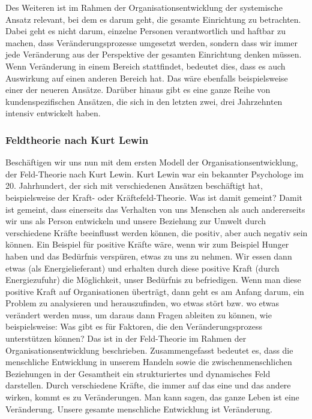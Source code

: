 \documentclass[
  letterpaper,
]{book}
\begin{document}
Des Weiteren ist im Rahmen der Organisationsentwicklung der systemische
Ansatz relevant, bei dem es darum geht, die gesamte Einrichtung zu
betrachten. Dabei geht es nicht darum, einzelne Personen verantwortlich
und haftbar zu machen, dass Veränderungsprozesse umgesetzt werden,
sondern dass wir immer jede Veränderung aus der Perspektive der gesamten
Einrichtung denken müssen. Wenn Veränderung in einem Bereich
stattfindet, bedeutet dies, dass es auch Auswirkung auf einen anderen
Bereich hat. Das wäre ebenfalls beispielsweise einer der neueren
Ansätze. Darüber hinaus gibt es eine ganze Reihe von kundenspezifischen
Ansätzen, die sich in den letzten zwei, drei Jahrzehnten intensiv
entwickelt haben.

\subsubsection{Feldtheorie nach Kurt
Lewin}\label{feldtheorie-nach-kurt-lewin}

Beschäftigen wir uns nun mit dem ersten Modell der
Organisationsentwicklung, der Feld-Theorie nach Kurt Lewin. Kurt Lewin
war ein bekannter Psychologe im 20. Jahrhundert, der sich mit
verschiedenen Ansätzen beschäftigt hat, beispielsweise der Kraft- oder
Kräftefeld-Theorie. Was ist damit gemeint? Damit ist gemeint, dass
einerseits das Verhalten von uns Menschen als auch andererseits wir uns
als Person entwickeln und unsere Beziehung zur Umwelt durch verschiedene
Kräfte beeinflusst werden können, die positiv, aber auch negativ sein
können. Ein Beispiel für positive Kräfte wäre, wenn wir zum Beispiel
Hunger haben und das Bedürfnis verspüren, etwas zu uns zu nehmen. Wir
essen dann etwas (als Energielieferant) und erhalten durch diese
positive Kraft (durch Energiezufuhr) die Möglichkeit, unser Bedürfnis zu
befriedigen. Wenn man diese positive Kraft auf Organisationen überträgt,
dann geht es am Anfang darum, ein Problem zu analysieren und
herauszufinden, wo etwas stört bzw. wo etwas verändert werden muss, um
daraus dann Fragen ableiten zu können, wie beispielsweise: Was gibt es
für Faktoren, die den Veränderungsprozess unterstützen können? Das ist
in der Feld-Theorie im Rahmen der Organisationsentwicklung beschrieben.
Zusammengefasst bedeutet es, dass die menschliche Entwicklung in unserem
Handeln sowie die zwischenmenschlichen Beziehungen in der Gesamtheit ein
strukturiertes und dynamisches Feld darstellen. Durch verschiedene
Kräfte, die immer auf das eine und das andere wirken, kommt es zu
Veränderungen. Man kann sagen, das ganze Leben ist eine Veränderung.
Unsere gesamte menschliche Entwicklung ist Veränderung.
\end{document}
